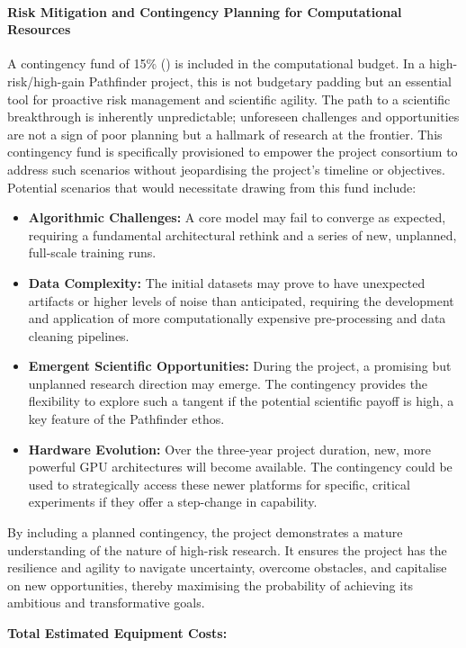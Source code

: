 \paragraph{Risk Mitigation and Contingency Planning for Computational Resources}
A contingency fund of 15\% () is included in the computational budget. In a high-risk/high-gain Pathfinder project, this is not budgetary padding but an essential tool for proactive risk management and scientific agility. The path to a scientific breakthrough is inherently unpredictable; unforeseen challenges and opportunities are not a sign of poor planning but a hallmark of research at the frontier. This contingency fund is specifically provisioned to empower the project consortium to address such scenarios without jeopardising the project's timeline or objectives. Potential scenarios that would necessitate drawing from this fund include:
\begin{itemize}
    \item \textbf{Algorithmic Challenges:} A core model may fail to converge as expected, requiring a fundamental architectural rethink and a series of new, unplanned, full-scale training runs.
    \item \textbf{Data Complexity:} The initial datasets may prove to have unexpected artifacts or higher levels of noise than anticipated, requiring the development and application of more computationally expensive pre-processing and data cleaning pipelines.
    \item \textbf{Emergent Scientific Opportunities:} During the project, a promising but unplanned research direction may emerge. The contingency provides the flexibility to explore such a tangent if the potential scientific payoff is high, a key feature of the Pathfinder ethos.
    \item \textbf{Hardware Evolution:} Over the three-year project duration, new, more powerful GPU architectures will become available. The contingency could be used to strategically access these newer platforms for specific, critical experiments if they offer a step-change in capability.
\end{itemize}
By including a planned contingency, the project demonstrates a mature understanding of the nature of high-risk research. It ensures the project has the resilience and agility to navigate uncertainty, overcome obstacles, and capitalise on new opportunities, thereby maximising the probability of achieving its ambitious and transformative goals.

\textbf{Total Estimated Equipment Costs: }


